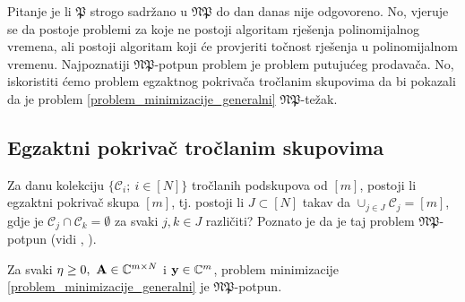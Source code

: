 \documentclass[a4paper,twoside,12pt]{memoir} %
\newcommand{\vect}[1]{\mathbf{#1}}
\renewcommand{\vec}{\vect}
\begin{document}
Pitanje je li $\mathfrak{P}$ strogo sadr\v{z}ano u  $\mathfrak{NP}$ do dan danas nije odgovoreno. No, vjeruje se da postoje problemi za koje ne postoji algoritam rje\v{s}enja polinomijalnog vremena, ali postoji algoritam koji \'ce provjeriti to\v{c}nost rje\v{s}enja u polinomijalnom vremenu.
Najpoznatiji $\mathfrak{NP}$-potpun problem je problem putuju\'ceg prodava\v{c}a. No, iskoristiti \'cemo  problem egzaktnog pokriva\v{c}a tro\v{c}lanim skupovima da bi pokazali da je problem \eqref{problem_minimizacije_generalni} $\mathfrak{NP}$-te\v{z}ak.

\subsection[Egzaktni pokriva\v{c} tro\v{c}lanim skupovima][Egzaktni pokriva\v{c} tro\v{c}lanim skupovima]{Egzaktni pokriva\v{c} tro\v{c}lanim skupovima}
Za danu kolekciju $\{\mathcal{C}_i;\ i \in [N]\}$ tro\v{c}lanih podskupova od $[m]$, postoji li egzaktni pokriva\v{c} skupa $[m]$, tj. postoji li $J \subset [N]$ takav da $\cup_{j \in J}\mathcal{C}_j=[m]$, gdje je $\mathcal{C}_j \cap \mathcal{C}_k = \emptyset$ za svaki $j,k \in J$ razli\v{c}iti? Poznato je da je taj problem $\mathfrak{NP}$-potpun (vidi \cite{Karp72}, \cite{garey1979computers}).
\begin{thm}
    Za svaki $\eta \geq 0,\ \vec A \in \C^{m \times N}$ i $\vec y \in \C^m$, problem minimizacije \eqref{problem_minimizacije_generalni} je $\mathfrak{NP}$-potpun.
\end{thm}
\end{document}
